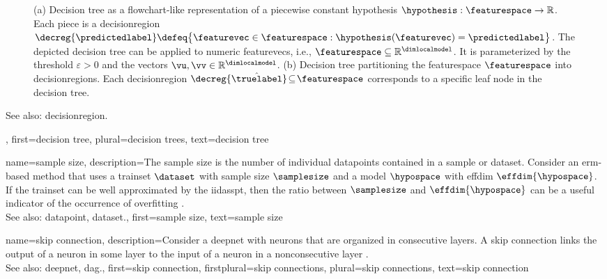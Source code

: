 {{\begin{figure}[H]
\begin{minipage}{.45\textwidth}
		\end{minipage}
		\caption{(a) Decision tree as a flowchart-like representation of a piecewise constant \gls{hypothesis} 
			$\hypothesis: \featurespace \rightarrow \mathbb{R}$. Each piece is a \gls{decisionregion} 
			$\decreg{\predictedlabel} \defeq \big\{ \featurevec \in  \featurespace: \hypothesis(\featurevec) = \predictedlabel \big\}$. 
			The depicted decision tree can be applied to numeric \glspl{featurevec}, i.e., $\featurespace \subseteq \mathbb{R}^{\dimlocalmodel}$. 
			It is parameterized by the threshold $\varepsilon>0$ and the \glspl{vector} $\vu, \vv \in \mathbb{R}^{\dimlocalmodel}$. 
			(b) Decision tree partitioning the \gls{featurespace} $\featurespace$ into \glspl{decisionregion}. Each \gls{decisionregion}  
			$\decreg{\hat{\truelabel}} \!\subseteq\!\featurespace$ corresponds to a specific leaf node in the decision tree.}
			\label{fig_decision_tree_dict}
		\end{figure} 
		See also: \gls{decisionregion}.},
	  first={decision tree},
	  plural={decision trees},
	  text={decision tree} 
}

{name={sample size},
	description={The \gls{sample} size is the number of individual \glspl{datapoint} contained in a 
	    	\gls{sample} or \gls{dataset}. Consider an \gls{erm}-based method that uses a 
		\gls{trainset} $\dataset$ with \gls{sample} size $\samplesize$ 
		and a \gls{model} $\hypospace$ with \gls{effdim} $\effdim{\hypospace}$. If the \gls{trainset} can 
		be well approximated by the \gls{iidasspt}, then the ratio between $\samplesize$ 
		and $\effdim{\hypospace}$ can be a useful indicator of the occurrence of \gls{overfitting} \cite[Ch. 6]{MLBasics}.
				\\
		See also: \gls{datapoint}, \gls{dataset}.},
	first={sample size},
	text={sample size}
}

{name={skip connection},
	description={Consider a \gls{deepnet} with \glspl{neuron} that are organized 
		in consecutive \glspl{layer}. A skip connection links the \gls{output} of a \gls{neuron} in 
		some \gls{layer} to the input of a \gls{neuron} in a nonconsecutive \gls{layer} \cite{HeResidual2016}.
		\\
		See also: \gls{deepnet}, \gls{dag}.},
 	first={skip connection},
 	firstplural={skip connections}, 
 	plural={skip connections}, 
 	text={skip connection}
}

